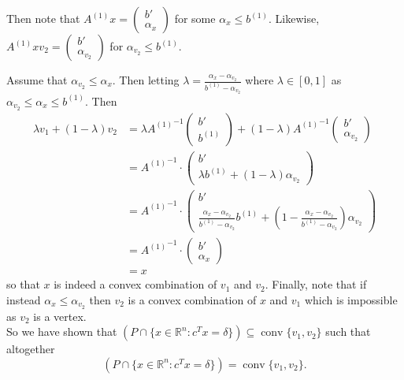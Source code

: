 \documentclass[11pt]{article}
\DeclareMathOperator{\conv}{conv}
\newcommand{\setR}{\mathbb{R}}
\renewcommand{\leq}{\leqslant}
\begin{document}
\begin{enumerate}[1)]
\begin{solution}
Then note that $ A^{(1)} x =  \begin{pmatrix} b' \\ \alpha_x\end{pmatrix}$ for some $\alpha_x \leq b^{(1)}$. Likewise,  $ A^{(1)} xv_2=  \begin{pmatrix} b' \\ \alpha_{v_2}\end{pmatrix}$ for $\alpha_{v_2} \leq b^{(1)}$. 

Assume that $\alpha_{v_2} \leq \alpha_x$. Then letting $\lambda = \frac{\alpha_x - \alpha_{v_2}}{b^{(1)}- \alpha_{v_2}}$ where $\lambda \in [0,1]$ as $\alpha_{v_2} \leq \alpha_x \leq b^{(1)}$. Then 
\begin{align*}
\lambda v_1 + (1- \lambda)v_2 & = \lambda {A^{(1)}}^{-1}\begin{pmatrix} b' \\ b^{(1)} \end{pmatrix} + (1 - \lambda) {A^{(1)}}^{-1}\begin{pmatrix} b' \\ \alpha_{v_2} \end{pmatrix} \\
& = {A^{(1)}}^{-1} \cdot \begin{pmatrix} b' \\ \lambda b^{(1)}  + (1-\lambda) \alpha_{v_2}\end{pmatrix} \\
& = {A^{(1)}}^{-1} \cdot \begin{pmatrix} b' \\ \frac{\alpha_x - \alpha_{v_2}}{b^{(1)}- \alpha_{v_2}} b^{(1)}  + \left(1-\frac{\alpha_x - \alpha_{v_2}}{b^{(1)}- \alpha_{v_2}}\right) \alpha_{v_2}\end{pmatrix} \\
& = {A^{(1)}}^{-1} \cdot \begin{pmatrix} b' \\ \alpha_x \end{pmatrix} \\
& = x
\end{align*}
so that $x$ is indeed a convex combination of $v_1$ and $v_2$. Finally, note that if instead $\alpha_{x} \leq \alpha_{v_2}$ then $v_2$ is a convex combination of $x$ and $v_1$ which is impossible as $v_2$ is a vertex. 
\\


So we have shown that $(P \cap \{x \in \setR^n: c^Tx = \delta\}) \subseteq \conv\{v_1, v_2\}$ such that altogether $$(P \cap \{x \in \setR^n: c^Tx = \delta\}) = \conv\{v_1, v_2\}.$$






\end{solution}
\end{enumerate}
\end{document}
